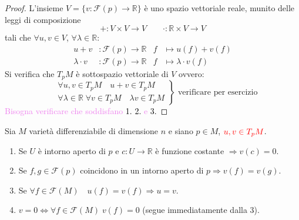         \begin{proof}
        \mbox{}

        L'insieme $V = \{ v : \mathcal{F}(p) \to \mathbb{R} \}$ è uno spazio vettoriale reale, munito delle leggi di composizione
        \[
        + : V \times V \to V \qquad \cdot : \mathbb{R} \times V \to V
        \]
        tali che $\forall u, v \in V$, $\forall \lambda \in \mathbb{R}$:
        \begin{align*}
        u + v &: \mathcal{F}(p) \to \mathbb{R} & f &\longmapsto u(f) + v(f) \\
        \lambda \cdot v &: \mathcal{F}(p) \to \mathbb{R} & f &\longmapsto \lambda \cdot v(f)
        \end{align*}
        Si verifica che $T_p M$ è sottospazio vettoriale di $V$ ovvero:
        \[
        \left.
        \begin{aligned}
        &\forall u, v \in T_p M \quad u + v \in T_p M \\
        &\forall \lambda \in \mathbb{R} \; \forall v \in T_p M \quad \lambda v \in T_p M
        \end{aligned}
        \right\} \text{ verificare per esercizio}
        \]
        \textcolor{violet}{Bisogna verificare che soddisfano \textcolor{black}{1. 2. \textcolor{violet}{e} 3.}}
        \end{proof}
        \newpage
        \begin{proposizione}[\textcolor{violet}{Proprietà vettori tangenti}]
        \label{prop:proprieta_vettori_tangenti}
        \mbox{}

        Sia $M$ varietà differenziabile di dimensione $n$ e siano $p \in M$, $\textcolor{red}{u, v \in T_p M}$.
        \begin{enumerate}
        \item Se $U$ è intorno aperto di $p$ e $c : U \to \mathbb{R}$ è funzione costante $\Rightarrow v(c) = 0$.
        \item Se $f, g \in \mathcal{F}(p)$ coincidono in un intorno aperto di $p \Rightarrow v(f) = v(g)$.
        \item Se $\forall f \in \mathcal{F}(M) \quad u(f) = v(f) \Rightarrow u = v$.
        \item $v = 0 \iff \forall f \in \mathcal{F}(M) \; v(f) = 0$ \textcolor{blu}{(segue immediatamente dalla 3)}.
        \end{enumerate}
        \end{proposizione}

